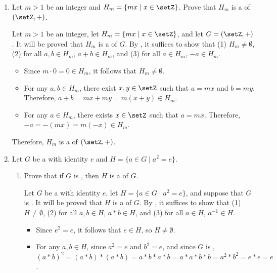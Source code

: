 \begin{enumerate}
\begin{subprove}
    By , it follows that \(P(k)\) is true for all nonnegative integers \(k\).
  \end{subprove}
  \item Let \(m > 1\) be an integer and \(H_{m} = \{m x \mid x \in \setZ\}\).
  Prove that \(H_{m}\) is a  of \((\setZ, +)\).
  \begin{subprove}
    Let \(m > 1\) be an integer, let \(H_{m} = \{m x \mid x \in \setZ\}\), and let \(G = (\setZ, +)\).
    It will be proved that \(H_{m}\) is a  of \(G\).
    By , it suffices to show that (1) \(H_{m} \neq \emptyset\), (2) for all \(a, b \in H_{m}\), \(a + b \in H_{m}\), and (3) for all \(a \in H_{m}\), \(-a \in H_{m}\).
    \begin{itemize}
      \item Since \(m \cdot 0 = 0 \in H_{m}\), it follows that \(H_{m} \neq \emptyset\).
      \item For any \(a, b \in H_{m}\), there exist \(x, y \in \setZ\) such that \(a = m x\) and \(b = m y\).
      Therefore, \(a + b = m x + m y = m(x + y) \in H_{m}\).
      \item For any \(a \in H_{m}\), there exists \(x \in \setZ\) such that \(a = m x\).
      Therefore, \(-a = -(m x) = m(-x) \in H_{m}\).
    \end{itemize}
    Therefore, \(H_{m}\) is a  of \((\setZ, +)\).
  \end{subprove}
  \item Let \(G\) be a  with identity \(e\) and \(H = \{a \in G \mid a^{2} = e\}\).
  \begin{enumerate}
    \item Prove that if \(G\) is , then \(H\) is a  of \(G\).
    \begin{subprove}
      Let \(G\) be a  with identity \(e\), let \(H = \{a \in G \mid a^{2} = e\}\), and suppose that \(G\) is .
      It will be proved that \(H\) is a  of \(G\).
      By , it suffices to show that (1) \(H \neq \emptyset\), (2) for all \(a, b \in H\), \(a * b \in H\), and (3) for all \(a \in H\), \(a^{-1} \in H\).
      \begin{itemize}
        \item Since \(e^{2} = e\), it follows that \(e \in H\), so \(H \neq \emptyset\).
        \item For any \(a, b \in H\), since \(a^{2} = e\) and \(b^{2} = e\), and since \(G\) is , \((a * b)^{2} = (a * b) * (a * b) = a * b * a * b = a * a * b * b = a^{2} * b^{2} = e * e = e\).

\end{itemize}
\end{subprove}
\end{enumerate}
\end{enumerate}
